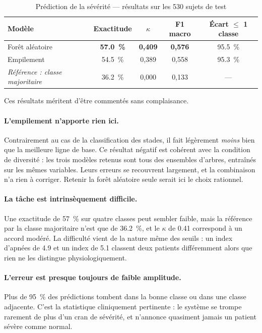 \begin{table}[H]
\centering

\small
\begin{tabular}{@{}lcccc@{}}
\toprule
\textbf{Modèle} & \textbf{Exactitude} & \textbf{$\kappa$} & \textbf{F1 macro} &
\textbf{Écart $\leq$ 1 classe} \\
\midrule
Forêt aléatoire & \textbf{\SI{57,0}{\percent}} & \textbf{0,409} & \textbf{0,576} &
\SI{95,5}{\percent} \\
Empilement & \SI{54,5}{\percent} & 0,389 & 0,558 & \SI{95,3}{\percent} \\
\midrule
\emph{Référence : classe majoritaire} & \SI{36,2}{\percent} & 0,000 & 0,133 & --- \\
\bottomrule
\end{tabular}
\caption{Prédiction de la sévérité --- résultats sur les 530 sujets de test}
\label{tab:osa-resultats}
\end{table}

Ces résultats méritent d'être commentés sans complaisance.

\paragraph{L'empilement n'apporte rien ici.} Contrairement au cas de la classification
des stades, il fait légèrement \emph{moins} bien que la meilleure ligne de base. Ce
résultat négatif est cohérent avec la condition de diversité : les trois modèles retenus
sont tous des ensembles d'arbres, entraînés sur les mêmes variables. Leurs erreurs se
recouvrent largement, et la combinaison n'a rien à corriger. Retenir la forêt aléatoire
seule serait ici le choix rationnel.

\paragraph{La tâche est intrinsèquement difficile.} Une exactitude de \SI{57}{\percent}
sur quatre classes peut sembler faible, mais la référence par la classe majoritaire n'est
que de \SI{36,2}{\percent}, et le $\kappa$ de \num{0,41} correspond à un accord modéré. La
difficulté vient de la nature même des seuils : un index d'apnées de \num{4,9} et un index
de \num{5,1} classent deux patients différemment alors que rien ne les distingue
physiologiquement.

\paragraph{L'erreur est presque toujours de faible amplitude.} Plus de \SI{95}{\percent}
des prédictions tombent dans la bonne classe ou dans une classe adjacente. C'est la
statistique cliniquement pertinente : le système se trompe rarement de plus d'un cran de
sévérité, et n'annonce quasiment jamais un patient sévère comme normal.

